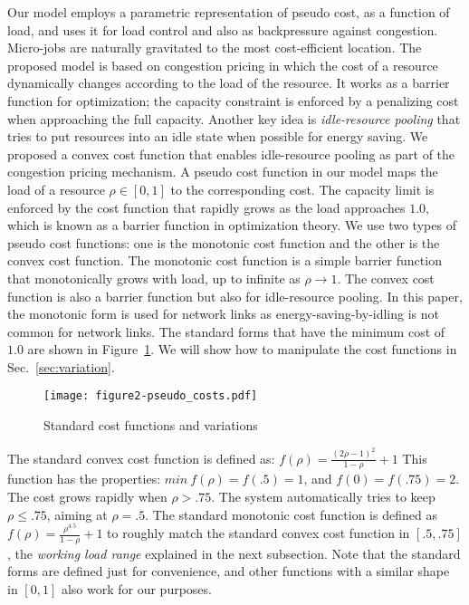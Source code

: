 Our model employs a parametric representation of pseudo cost, as a
function of load, and uses it for load control and also as
backpressure against congestion.
Micro-jobs are naturally gravitated to the most cost-efficient
location.
The proposed model is based on congestion pricing in which the cost of
a resource dynamically changes according to the load of the resource.
It works as a barrier function for optimization; the capacity
constraint is enforced by a penalizing cost when approaching the full
capacity.
Another key idea is {\em idle-resource pooling} that tries to put resources
into an idle state when possible for energy saving.
We proposed a convex cost function that enables idle-resource pooling
as part of the congestion pricing mechanism.
A pseudo cost function in our model maps the load of a resource
$\rho \in [0, 1]$ to the corresponding cost.
The capacity limit is enforced by the cost function that rapidly grows
as the load approaches $1.0$, which is known as a barrier function in
optimization theory.
We use two types of pseudo cost functions: one is the monotonic cost
function and the other is the convex cost function.
The monotonic cost function is a simple barrier function that
monotonically grows with load, up to infinite as $\rho \to 1$.
The convex cost function is also a barrier function but also for
idle-resource pooling.
In this paper, the monotonic form is used for network links as
energy-saving-by-idling is not common for network links.
The standard forms that have the minimum cost of $1.0$ are
shown in Figure~\ref{fig:std_costfunc}. We will show how to manipulate
the cost functions in Sec.~\ref{sec:variation}.

\begin{figure}[tb]
  \begin{center}
    \texttt{[image: figure2-pseudo\_costs.pdf]}
    \vspace{-2.0ex}
    \caption{Standard cost functions and variations}
    \label{fig:std_costfunc}
  \end{center}
\end{figure}

The standard convex cost function is defined as:
\(f(\rho) = \frac{(2\rho - 1)^{2}}{1 - \rho} + 1\)
This function has the properties:
$min\: f(\rho) = f(.5) = 1$, and $f(0) = f(.75) = 2$.
The cost grows rapidly when $\rho > .75$.
The system automatically tries to keep $\rho \le .75$,
aiming at $\rho = .5$.
The standard monotonic cost function is defined as
\( f(\rho) = \frac{\rho^{4.5}}{1 - \rho} + 1\)
to roughly match the standard convex cost function in $[.5, .75]$,
the {\em working load range} explained in the next subsection.
Note that the standard forms are defined just for convenience, and
other functions with a similar shape in $[0,1]$ also work for our
purposes.

